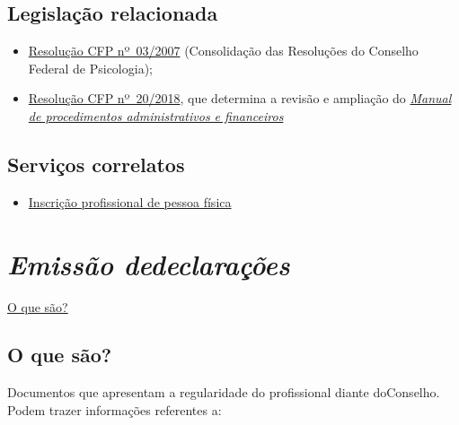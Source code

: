 \section{Legislação relacionada}

\begin{itemize}
  \item  \href{https://atosoficiais.com.br/cfp/resolucao-administrativa-financeira-n-3-2007-institui-a-consolidacao-das-resolucoes-do-conselho-federal-de-psicologia?origin=instituicao&q=resolu\%C3\%A7\%C3\%A3o\%203/2007}{Resolução  CFP nº~03/2007} (Consolidação das Resoluções do Conselho Federal de  Psicologia);
  \item  \href{https://transparencia.cfp.org.br/wp-content/uploads/sites/7/2020/05/Manual-de-Procedimentos-Administrativos-e-Financeiro-CFP-RES-20.2018.pdf}{\href{https://atosoficiais.com.br/cfp/resolucao-administrativa-financeira-n-20-2018-altera-o-manual-de-procedimentos-administrativo-e-financeiro-do-sistema-conselhos-de-psicologia-anexo-da-resolucao-cfp-n-202018-a-resolucao-cfp-n-03-2007-a-resolucao-cfp-n-16-2019-e-da-outras-providencias}{Resolução  CFP nº~20/2018}}, que determina a revisão e ampliação do  \href{https://transparencia.cfp.org.br/wp-content/uploads/sites/7/2020/05/Manual-de-Procedimentos-Administrativos-e-Financeiro-CFP-RES-20.2018.pdf}{\emph{Manual  de procedimentos administrativos e financeiros}}
\end{itemize}

\section{Serviços correlatos}

\begin{itemize}
  \item  \hyperref[]{Inscrição  profissional de pessoa física}
\end{itemize}

\chapter{\texorpdfstring{\emph{Emissão dedeclarações}}{Emissão de declarações}}

\hyperref[]{O que são?}
\section{O que são?}

Documentos que apresentam a regularidade do profissional diante doConselho. Podem trazer informações referentes a:

